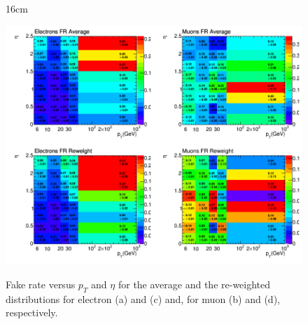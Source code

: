 \begin{figure}[htbp]{16cm}
	\caption{Fake rate versus $p_{T}$ and $\eta$ for the average and the re-weighted distributions for electron (a) and (c) and, for muon (b) and (d), respectively.}
	\centering
	\includegraphics[scale=0.5]{ChapterAnalysis/figs/fake_rate_2D_maps_for_systematics}
	\label{fig:fr_pt_eta_2D_systematics}
\end{figure}


